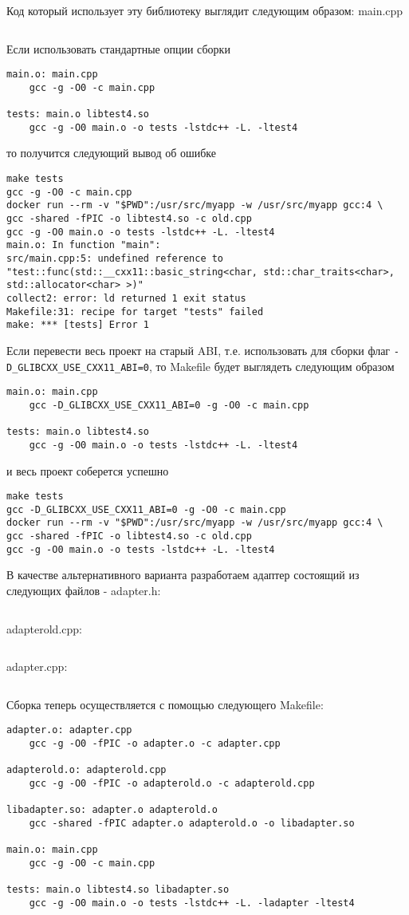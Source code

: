 \documentclass[14pt,a4paper]{article}
\begin{document}
Код который использует эту библиотеку выглядит следующим образом: main.cpp
\inputminted{c++}{./src/main.cpp}

Если использовать стандартные опции сборки
\begin{verbatim}
main.o: main.cpp
	gcc -g -O0 -c main.cpp 

tests: main.o libtest4.so
	gcc -g -O0 main.o -o tests -lstdc++ -L. -ltest4
\end{verbatim}
то получится следующий вывод об ошибке
\begin{verbatim}
make tests
gcc -g -O0 -c main.cpp 
docker run --rm -v "$PWD":/usr/src/myapp -w /usr/src/myapp gcc:4 \
gcc -shared -fPIC -o libtest4.so -c old.cpp
gcc -g -O0 main.o -o tests -lstdc++ -L. -ltest4
main.o: In function "main":
src/main.cpp:5: undefined reference to 
"test::func(std::__cxx11::basic_string<char, std::char_traits<char>, 
std::allocator<char> >)"
collect2: error: ld returned 1 exit status
Makefile:31: recipe for target "tests" failed
make: *** [tests] Error 1
\end{verbatim}


Если перевести весь проект на старый ABI, т.е. использовать для сборки
флаг \texttt{-D\_GLIBCXX\_USE\_CXX11\_ABI=0}, то Makefile будет выглядеть
следующим образом
\begin{verbatim}
main.o: main.cpp
	gcc -D_GLIBCXX_USE_CXX11_ABI=0 -g -O0 -c main.cpp

tests: main.o libtest4.so
	gcc -g -O0 main.o -o tests -lstdc++ -L. -ltest4
\end{verbatim}
и весь проект соберется успешно
\begin{verbatim}
make tests
gcc -D_GLIBCXX_USE_CXX11_ABI=0 -g -O0 -c main.cpp 
docker run --rm -v "$PWD":/usr/src/myapp -w /usr/src/myapp gcc:4 \
gcc -shared -fPIC -o libtest4.so -c old.cpp
gcc -g -O0 main.o -o tests -lstdc++ -L. -ltest4
\end{verbatim}

В качестве альтернативного варианта разработаем адаптер состоящий из
следующих файлов - adapter.h:
\inputminted{c++}{./src/adapter.h}
adapterold.cpp:
\inputminted{c++}{./src/adapterold.cpp}
adapter.cpp:
\inputminted{c++}{./src/adapter.cpp}

Сборка теперь осуществляется с помощью следующего Makefile:
\begin{verbatim}
adapter.o: adapter.cpp
	gcc -g -O0 -fPIC -o adapter.o -c adapter.cpp

adapterold.o: adapterold.cpp
	gcc -g -O0 -fPIC -o adapterold.o -c adapterold.cpp

libadapter.so: adapter.o adapterold.o
	gcc -shared -fPIC adapter.o adapterold.o -o libadapter.so 

main.o: main.cpp
	gcc -g -O0 -c main.cpp 

tests: main.o libtest4.so libadapter.so
	gcc -g -O0 main.o -o tests -lstdc++ -L. -ladapter -ltest4
\end{verbatim}
\end{document}
